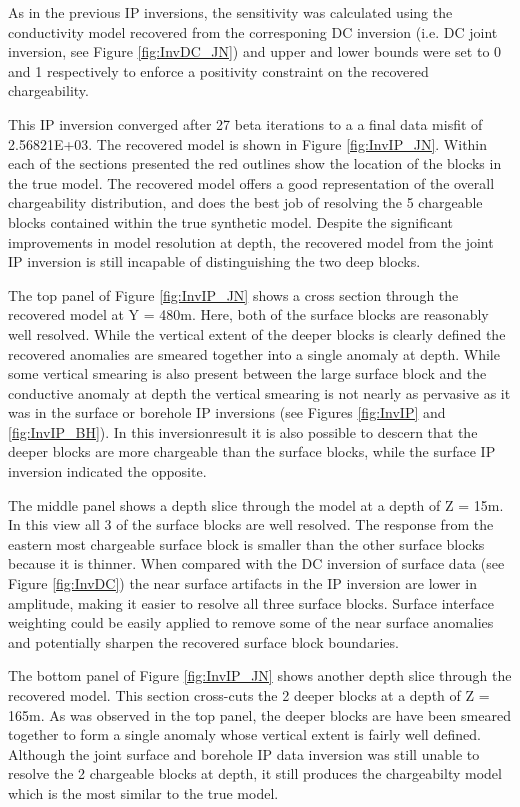 As in the previous IP inversions, the sensitivity was calculated using the conductivity model recovered from the corresponing DC inversion (i.e. DC joint inversion, see Figure \ref{fig:InvDC_JN}) and upper and lower bounds were set to 0 and 1 respectively to enforce a positivity constraint on the recovered chargeability.

This IP inversion converged after 27 beta iterations to a a final data misfit of 2.56821E+03. The recovered model is shown in Figure \ref{fig:InvIP_JN}. Within each of the sections presented the red outlines show the location of the blocks in the true model. The recovered  model offers a good representation of the overall chargeability distribution, and does the best job of resolving the 5 chargeable blocks contained within the true synthetic model. Despite the significant improvements in model resolution at depth, the recovered model from the joint IP inversion is still incapable of distinguishing the two deep blocks. 

The top panel of Figure \ref{fig:InvIP_JN} shows a cross section through the recovered model at Y = 480m. Here, both of the surface blocks are reasonably well resolved. While the vertical extent of the deeper blocks is clearly defined the recovered anomalies are smeared together into a single anomaly at depth. While some vertical smearing is also present between the large surface block and the conductive anomaly at depth the vertical smearing is not nearly as pervasive as it was in the surface or borehole IP inversions (see Figures \ref{fig:InvIP} and \ref{fig:InvIP_BH}). In this inversionresult it is also possible to descern that the deeper blocks are more chargeable than the surface blocks, while the surface IP inversion indicated the opposite.

The middle panel shows a depth slice through the model at a depth of Z = 15m. In this view all 3 of the surface blocks are well resolved. The response from the eastern most chargeable surface block is smaller than the other surface blocks because it is thinner. When compared with the DC inversion of surface data (see Figure \ref{fig:InvDC}) the near surface artifacts in the IP inversion are lower in amplitude, making it easier to resolve all three surface blocks. Surface interface weighting could be easily applied to remove some of the near surface anomalies and potentially sharpen the recovered surface block boundaries.

The bottom panel of Figure \ref{fig:InvIP_JN} shows another depth slice through the recovered model. This section cross-cuts the 2 deeper blocks at a depth of Z = 165m. As was observed in the top panel, the deeper blocks are have been smeared together to form a single anomaly whose vertical extent is fairly well defined. Although the joint surface and borehole IP data inversion was still unable to resolve the 2 chargeable blocks at depth, it still produces the chargeabilty model which is the most similar to the true model.  



